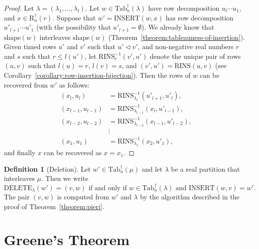 \documentclass[10pt]{amsproc}
\theoremstyle{definition}
\newtheorem{definition}[theorem]{Definition}
\theoremstyle{remark}
\newcommand{\rowins}{\mathrm{RINS}}
\newcommand{\ins}{\mathrm{INSERT}}
\newcommand{\del}{\mathrm{DELETE}}
\newcommand{\shape}{\mathrm{shape}}
\newcommand{\ttab}{\mathrm{Tab}^\dagger}
\newcommand{\tr}{\mathrm{R}^\dagger}
\begin{document}
\begin{proof}
  Let $\lambda=(\lambda_1,\dotsc,\lambda_l)$.
  Let $w\in \ttab_n(\lambda)$ have row decomposition $u_l\dotsb u_1$, and $x\in \tr_n(r)$.
  Suppose that $w'=\ins(w,x)$ has row decomposition $u'_{l+1}\dotsb u'_1$ (with the possibility that $u'_{l+1}=\emptyset$).
  We already know that $\shape(w)$ interleaves $\shape(w)$ (Theorem~\ref{theorem:tableauness-of-insertion}).
  Given timed rows $u'$ and $v'$ such that $u'\lhd v'$, and non-negative real numbers $r$ and $s$ such that $r\leq l(u')$, let $\rowins^{-1}_r(v',u')$ denote the unique pair of rows $(u,v)$ such that $l(u)=r$, $l(v)=s$, and $(v',u')=\rowins(u,v)$ (see Corollary~\ref{corollary:row-insertion-bijection}).
  Then the rows of $w$ can be recovered from $w'$ as follows:
  \begin{align*}
    (x_l, u_l) & = \rowins^{-1}_{\lambda_l}(u'_{l+1},u'_l),\\
    (x_{l-1},u_{l-1}) & = \rowins^{-1}_{\lambda_{l-1}}(x_l,u'_{l-1}),\\
    (x_{l-2},u_{l-2}) & = \rowins^{-1}_{\lambda_{l-2}}(x_{l-1},u'_{l-2}),\\
    &\vdots\\
    (x_1,u_1) & = \rowins^{-1}_{\lambda_1}(x_2,u'_1),
  \end{align*}
  and finally $x$ can be recovered as $x=x_1$.
\end{proof}
\begin{definition}
  [Deletion]
  \label{definition:deletion}
  Let $w'\in \ttab_n(\mu)$ and let $\lambda$ be a real partition that interleaves $\mu$.
  Then we write
  \begin{displaymath}
    \del_\lambda(w')=(v,w) \text{ if and only if } w\in \ttab_n(\lambda) \text{ and }\ins(w,v)=w'.
  \end{displaymath}
  The pair $(v,w)$ is computed from $w'$ and $\lambda$ by the algorithm described in the proof of Theorem~\ref{theorem:pieri}.
\end{definition}
\section{Greene's Theorem}
\label{sec:greene}
\end{document}
